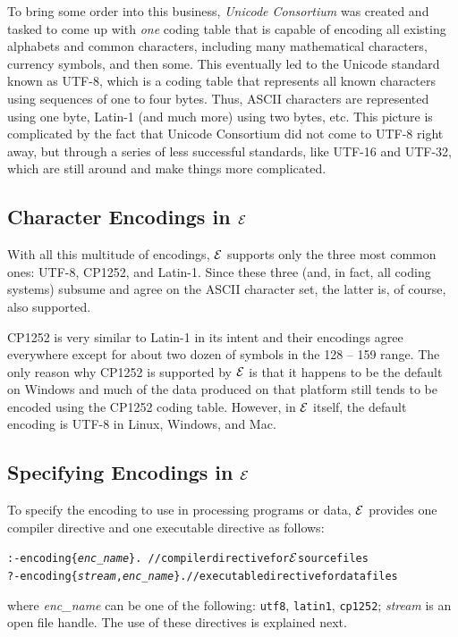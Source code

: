 \documentclass[11pt]{article}
\newcommand{\ERGO}{\mbox{\ensuremath{\cal{E}}\smaller{{\sc{RGO}}}}\xspace}
\newcommand{\FLSYSTEM}{\ERGO}
\begin{document}
To bring some order into this business, \emph{Unicode Consortium}   
was created and tasked to come up with \emph{one} coding table that is
capable of encoding all existing alphabets and common characters, including
many mathematical characters, currency symbols, and then some.  This eventually
led to the
Unicode standard known as UTF-8, which is a coding table that represents
all known characters using sequences of one to four bytes. Thus, ASCII
characters are represented using one byte, Latin-1 (and much more) using two
bytes, etc.
This picture is complicated by the fact that Unicode Consortium did not
come to UTF-8 right away, but through a series of less successful
standards, like UTF-16 and UTF-32, which are still around and make things
more complicated.

\subsection{Character Encodings in \FLSYSTEM}

With all this multitude of encodings,
\FLSYSTEM supports only the three most common ones:
UTF-8, CP1252, and Latin-1. Since these three (and, in fact, all coding
systems) subsume and
agree on the ASCII character set, the latter is, of course, also supported.

CP1252 is very similar to Latin-1 in its intent and their encodings agree 
everywhere except for about two dozen of symbols in the 128 -- 159 range.
The only reason why CP1252 is supported by \FLSYSTEM is that it happens to
be the default on Windows and much of the data produced on that platform
still tends to be encoded using the CP1252 coding table.
However, in \FLSYSTEM itself, the default encoding is UTF-8 in Linux,
Windows, and Mac.

\subsection{Specifying Encodings in \FLSYSTEM}

To specify the encoding to use in processing programs or data, \FLSYSTEM
provides one compiler directive and one executable directive as follows:
\begin{alltt}
:- encoding\{\textnormal{\emph{enc\_name}}\}.      \,  // compiler directive for \FLSYSTEM source files
?- encoding\{\textnormal{\emph{stream},\emph{enc\_name}}\}.  // executable directive for data files
\end{alltt}
where \emph{enc\_name} can be one of the following:  \texttt{utf8},
\texttt{latin1}, \texttt{cp1252}; \emph{stream} is an open file handle. 
The use of these directives is explained next.
\end{document}
